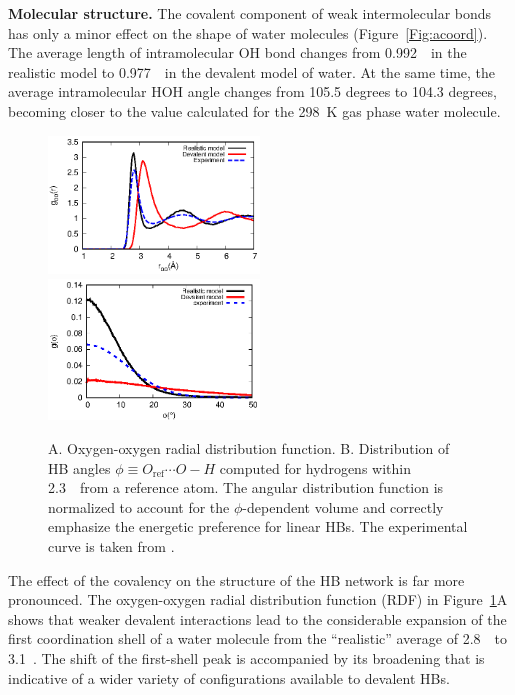 \documentclass[aps,prl,reprint,amsmath,amssymb]{revtex4-1}
\begin{document}
\textbf{Molecular structure.} The covalent component of weak intermolecular bonds has only a minor effect on the shape of water molecules (Figure~\ref{Fig:acoord}). 
The average length of intramolecular OH bond changes from 0.992~\Ang\ in the realistic model to 0.977~\Ang\ in the devalent model of water. 
At the same time, the average intramolecular HOH angle changes from 105.5 degrees to 104.3 degrees, becoming closer to the value calculated for the 298~K gas phase water molecule.

\begin{figure}
\includegraphics[width=0.5\textwidth]{new_rdf}
\includegraphics[width=0.5\textwidth]{new_adf}
\caption{A. Oxygen-oxygen radial distribution function. B. Distribution of HB angles $\phi \equiv O_{\text{ref}} \cdots O-H$ computed for hydrogens within 2.3~\Ang\ from a reference atom. The angular distribution function is normalized to account for the $\phi$-dependent volume and correctly emphasize the energetic preference for linear HBs. \blue The experimental curve is taken from \cite{modig2003temperature}. \old} \label{Fig:RDF}
\end{figure}


The effect of the covalency on the structure of the HB network is far more pronounced. 
The oxygen-oxygen radial distribution function (RDF) in Figure~\ref{Fig:RDF}A shows that weaker devalent interactions lead to the considerable expansion of the first coordination shell of a water molecule from the ``realistic'' average of 2.8~\Ang\ to 3.1~\Ang. 
The shift of the first-shell peak is accompanied by its broadening that is indicative of a wider variety of configurations available to devalent HBs.
\end{document}
